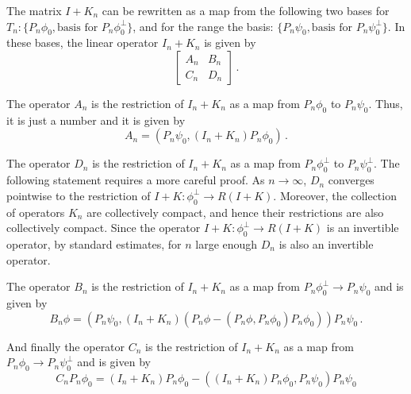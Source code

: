 The matrix $I+K_{n}$ can be rewritten as a map from the
following two bases for $T_{n}: \{ P_{n} \phi_{0}, \text{basis for }
P_{n}\phi_{0}^{\perp} \}$, and for the range the basis:
$\{ P_{n} \psi_{0}, \text{basis for } P_{n} \psi_{0}^{\perp} \}$.
In these bases, the linear operator $I_{n} + K_{n}$ is given by
\begin{equation}
\begin{bmatrix}
A_{n} & B_{n} \\
C_{n} & D_{n} 
\end{bmatrix} \, .
\end{equation}

The operator $A_{n}$
is the restriction of $I_{n} + K_{n}$ as a map from $P_{n} \phi_{0}$ 
to $P_{n} \psi_{0}$. Thus, it is just a number and it is given by
\begin{equation}
A_{n} = \left(P_{n} \psi_{0}, (I_{n} + K_{n}) P_{n} \phi_{0} \right) \,.
\end{equation}

The operator $D_{n}$ is the restriction of $I_{n} + K_{n}$ 
as a map from $P_{n} \phi_{0}^{\perp}$ 
to $P_{n} \psi_{0}^{\perp}$.
The following statement requires a more careful proof.
{\color{red} As $n \to \infty$, $D_{n}$ converges pointwise to the restriction
of $I + K: \phi_{0}^{\perp} \to R(I+K)$. Moreover, the collection
of operators $K_{n}$ are collectively compact, and hence their restrictions
are also collectively compact. 
Since the operator $I+K: \phi_{0}^{\perp} \to R(I+K)$ is an invertible
operator, by standard estimates, for $n$ large enough $D_{n}$ is also 
an invertible operator.}

The operator $B_{n}$ is the restriction of $I_{n} + K_{n}$ as a map from 
$P_{n} \phi_{0} ^{\perp} \to P_{n} \psi_{0}$ and is given by
\begin{equation}
B_{n} \phi = \left( P_{n} \psi_{0}, (I_{n} + K_{n}) 
(P_{n} \phi -( P_{n} \phi, P_{n} \phi_{0}) P_{n} \phi_{0}) \right) P_{n} \psi_{0}  \, .
\end{equation}

And finally the operator $C_{n}$ is the restriction of $I_{n} + K_{n}$ as a map from
$P_{n} \phi_{0} \to P_{n} \psi_{0}^{\perp}$ and is given by
\begin{equation}
C_{n}P_{n} \phi_{0} = (I_{n} + K_{n}) P_{n} \phi_{0} - \left( (I_{n} + K_{n}) P_{n}\phi_{0}, P_{n} \psi_{0} \right)P_{n} \psi_{0}
\end{equation}


